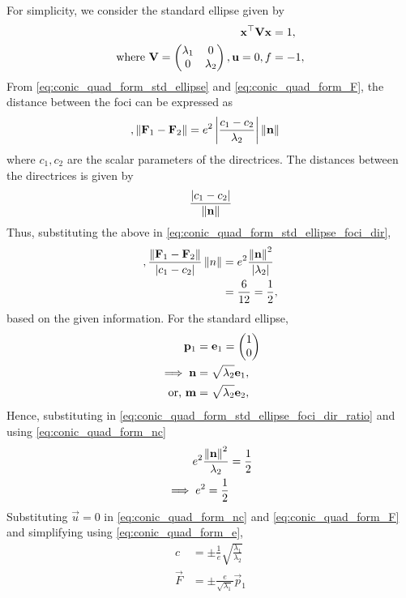 \documentclass[journal,12pt,twocolumn]{IEEEtran}
\renewcommand\thesection{\arabic{section}}
\renewcommand\thesubsection{\thesection.\arabic{subsection}}
\begin{document}
\begin{enumerate}[label=\thesubsection.\arabic*.,ref=\thesubsection.\theenumi]
\begin{enumerate}
	\solution For simplicity, we consider the standard ellipse given by 
\begin{align}
	\mathbf{x}^{\top}\mathbf{V}\mathbf{x} &= 1,
	\\
	\text{where }
	\mathbf{V} = \begin{pmatrix}\lambda_1 & 0 \\ 0 & \lambda_2\end{pmatrix}, \mathbf{u} = 0, f &= -1
  \label{eq:conic_quad_form_std_ellipse}, 
\end{align}
From 
  \eqref{eq:conic_quad_form_std_ellipse} and  
  \eqref{eq:conic_quad_form_F}, 
  the distance between the foci can be expressed as
\begin{align}
  \label{eq:conic_quad_form_std_ellipse_foci_dir}, 
	\left\lVert\mathbf{F}_1 - \mathbf{F}_2\right\rVert  &= e^2\left\vert\frac{c_1-c_2}{\lambda_2}\right\vert\left\lVert\mathbf{n}\right\rVert
\end{align}
%
where $c_1,c_2$ are the scalar parameters of the directrices.  The distances between the directrices is given by 
\begin{align}
	\frac{\left\vert c_1-c_2\right\vert}{\left\lVert\mathbf{n}\right\rVert}
\end{align}
Thus, substituting the above in 
  \eqref{eq:conic_quad_form_std_ellipse_foci_dir}, 
\begin{align}
  \label{eq:conic_quad_form_std_ellipse_foci_dir_ratio}, 
	\frac{\left\lVert\mathbf{F}_1 - \mathbf{F}_2\right\rVert}{\left\vert c_1-c_2\right\vert} \left\lVert n\right\rVert &= e^2\frac{\left\lVert\mathbf{n}\right\rVert^2}{\left\vert\lambda_2\right\vert}
	\\
	&=\frac{6}{12} = \frac{1}{2},
\end{align}
based on the given information.  For the standard ellipse, 
\begin{align}
	\mathbf{p}_1 &= \mathbf{e}_1 = \begin{pmatrix}1 \\ 0\end{pmatrix}
	\\
	\implies \mathbf{n} &= \sqrt{\lambda_2}\mathbf{e}_1,  
	\\
	\text{or, }\mathbf{m} &=\sqrt{\lambda_2}\mathbf{e}_2,   
\end{align}
Hence, substituting in 
  \eqref{eq:conic_quad_form_std_ellipse_foci_dir_ratio} and using  
\eqref{eq:conic_quad_form_nc} 
\begin{align}
	e^2\frac{\left\lVert\mathbf{n}\right\rVert^2}{\lambda_2} &= \frac{1}{2}
	\\
	\implies e^2 = \frac{1}{2}
\end{align}
Substituting $\vec{u} = 0$ in 
\eqref{eq:conic_quad_form_nc} and 
  \eqref{eq:conic_quad_form_F} 
  and simplifying using
  \eqref{eq:conic_quad_form_e},
\begin{align}
	c &= \pm \frac{1}{e}\sqrt{\frac{\lambda_1}{\lambda_2}}
	\\
	\vec{F} &= \pm \frac{e}{\sqrt{\lambda_1}}\vec{p}_1

\end{align}
\end{enumerate}
\end{enumerate}
\end{document}
